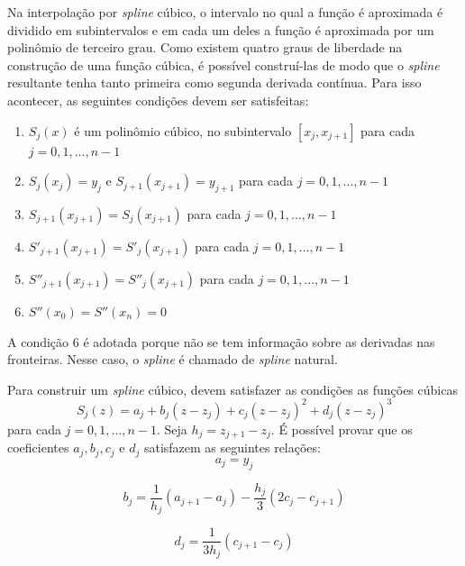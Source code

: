 \documentclass[a4paper,10pt]{article}
\begin{document}
  Na interpolação por \emph{spline} cúbico, o intervalo no qual a função é aproximada é dividido em subintervalos e em cada um deles a função é aproximada por um polinômio de terceiro grau. Como existem quatro graus de liberdade na construção de uma função cúbica, é possível construí-las de modo que o \emph{spline} resultante tenha tanto primeira como segunda derivada contínua.
  Para isso acontecer, as seguintes condições devem ser satisfeitas:
  \begin{enumerate}
  \item $S_j(x)$ é um polinômio cúbico, no subintervalo $[x_j,x_{j+1}]$ para cada $j = 0,1,...,n-1$
  \item $S_j(x_j) = y_j$ e $S_{j+1}(x_{j+1}) = y_{j+1} $ para cada $j = 0,1,...,n-1$
  \item $S_{j+1}(x_{j+1})=S_j(x_{j+1})$ para cada $j = 0,1,...,n-1$
  \item $S'_{j+1}(x_{j+1})=S'_j(x_{j+1})$ para cada $j = 0,1,...,n-1$
  \item $S''_{j+1}(x_{j+1})=S''_j(x_{j+1})$ para cada $j = 0,1,...,n-1$
  \item $S''(x_0) = S''(x_n) = 0$
  \end{enumerate}
  
  A condição 6 é adotada porque não se tem informação sobre as derivadas nas fronteiras. Nesse caso, o \emph{spline} é chamado de \emph{spline} natural.  
  
Para construir um \emph{spline} cúbico, devem satisfazer as condições as funções cúbicas
  \begin{equation}
   S_j(z) = a_j + b_j(z - z_j)+c_j(z-z_j)^2 + d_j(z-z_j)^3
   \label{eq:spline}
  \end{equation}
  para cada $j = 0, 1, ..., n-1$.
  Seja $h_j=z_{j+1}-z_j$.
  É possível provar \cite{burden} que os coeficientes $a_j, b_j, c_j$ e $d_j$ satisfazem as seguintes relações:
  \begin{equation}
   a_j = y_{j}
  \label{eq:coef_a}
  \end{equation}
  
  \begin{equation}
  b_j = \frac{1}{h_j}(a_{j+1} - a_j) - \frac{h_j}{3}(2c_j - c_{j+1})
  \label{eq:coef_b}
  \end{equation}
  
  \begin{equation}
   d_j = \frac{1}{3h_j}(c_{j+1}-c_j)
  \label{eq:coef_d}
  \end{equation}
\end{document}
